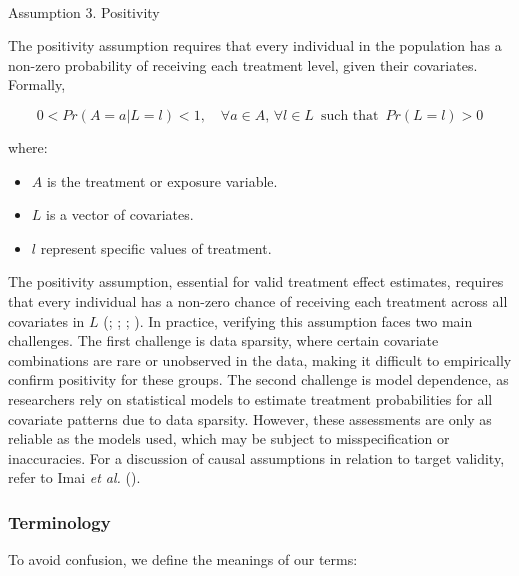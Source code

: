 \documentclass[
  single column]{article}
\makeatletter
\let\oldparagraph\paragraph
\renewcommand{\paragraph}{
    \@ifstar
      \xxxParagraphStar
      \xxxParagraphNoStar
  }
\newcommand{\xxxParagraphStar}[1]{\oldparagraph*{#1}\mbox{}}
\newcommand{\xxxParagraphNoStar}[1]{\oldparagraph{#1}\mbox{}}
\providecommand{\tightlist}{%
  \setlength{\itemsep}{0pt}\setlength{\parskip}{0pt}}\usepackage{longtable,booktabs,array}
\makeatother
\begin{document}
\paragraph{Assumption 3. Positivity}\label{assumption-3.-positivity}

The positivity assumption requires that every individual in the
population has a non-zero probability of receiving each treatment level,
given their covariates. Formally,

\[
0 < Pr(A = a | L = l) < 1, \quad \forall a \in A, \, \forall l \in L \, \text{ such that } \, Pr(L = l) > 0
\]

where:

\begin{itemize}
\tightlist
\item
  \(A\) is the treatment or exposure variable.
\item
  \(L\) is a vector of covariates.
\item
  \(l\) represent specific values of treatment.
\end{itemize}

The positivity assumption, essential for valid treatment effect
estimates, requires that every individual has a non-zero chance of
receiving each treatment across all covariates in \(L\)
(;
;
;
). In practice,
verifying this assumption faces two main challenges. The first challenge
is data sparsity, where certain covariate combinations are rare or
unobserved in the data, making it difficult to empirically confirm
positivity for these groups. The second challenge is model dependence,
as researchers rely on statistical models to estimate treatment
probabilities for all covariate patterns due to data sparsity. However,
these assessments are only as reliable as the models used, which may be
subject to misspecification or inaccuracies. For a discussion of causal
assumptions in relation to target validity, refer to Imai \emph{et al.}
().

\subsubsection{Terminology}\label{terminology}

To avoid confusion, we define the meanings of our terms:
\end{document}

